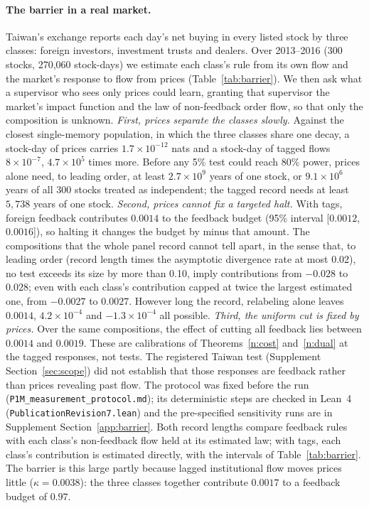 \documentclass[12pt]{article}
\theoremstyle{definition}
\theoremstyle{remark}
\begin{document}
\paragraph{The barrier in a real market.} Taiwan's exchange reports each day's net buying in every listed stock by three classes: foreign investors, investment trusts and dealers. Over 2013--2016 (300 stocks, 270{,}060 stock-days) we estimate each class's rule from its own flow and the market's response to flow from prices (Table~\ref{tab:barrier}). We then ask what a supervisor who sees only prices could learn, granting that supervisor the market's impact function and the law of non-feedback order flow, so that only the composition is unknown. \emph{First, prices separate the classes slowly.} Against the closest single-memory population, in which the three classes share one decay, a stock-day of prices carries $1.7\times10^{-12}$ nats and a stock-day of tagged flows $8\times10^{-7}$, $4.7\times10^{5}$ times more. Before any 5\% test could reach 80\% power, prices alone need, to leading order, at least $2.7\times10^{9}$ years of one stock, or $9.1\times10^{6}$ years of all 300 stocks treated as independent; the tagged record needs at least $5{,}738$ years of one stock. \emph{Second, prices cannot fix a targeted halt.} With tags, foreign feedback contributes $0.0014$ to the feedback budget (95\% interval [$0.0012$, $0.0016$]), so halting it changes the budget by minus that amount. The compositions that the whole panel record cannot tell apart, in the sense that, to leading order (record length times the asymptotic divergence rate at most 0.02), no test exceeds its size by more than 0.10, imply contributions from $-0.028$ to $0.028$; even with each class's contribution capped at twice the largest estimated one, from $-0.0027$ to $0.0027$. However long the record, relabeling alone leaves $0.0014$, $4.2\times10^{-4}$ and $-1.3\times10^{-4}$ all possible. \emph{Third, the uniform cut is fixed by prices.} Over the same compositions, the effect of cutting all feedback lies between $0.0014$ and $0.0019$. These are calibrations of Theorems~\ref{n:cost} and~\ref{n:dual} at the tagged responses, not tests. The registered Taiwan test (Supplement Section~\ref{sec:scope}) did not establish that those responses are feedback rather than prices revealing past flow. The protocol was fixed before the run (\nolinkurl{P1M_measurement_protocol.md}); its deterministic steps are checked in Lean~4 (\nolinkurl{PublicationRevision7.lean}) and the pre-specified sensitivity runs are in Supplement Section~\ref{app:barrier}. Both record lengths compare feedback rules with each class's non-feedback flow held at its estimated law; with tags, each class's contribution is estimated directly, with the intervals of Table~\ref{tab:barrier}. The barrier is this large partly because lagged institutional flow moves prices little ($\kappa=0.0038$): the three classes together contribute $0.0017$ to a feedback budget of $0.97$.
\end{document}
